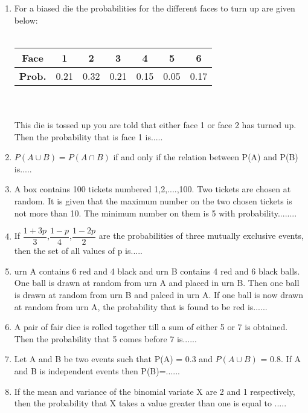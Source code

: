 \documentclass[journal,12pt,twocolumn]{IEEEtran}
\begin{document}
\renewcommand{\thefigure}{\theenumi}
\renewcommand{\thetable}{\theenumi}
\begin{enumerate}[label=\arabic*]
	\item For a biased die the probabilities for the different faces to turn up are given below:\\
	\\
	\begin{tabular}{ |c|c|c|c|c|c|c| }
	\hline
	\textbf{Face} &1 &2 &3 &4 &5 &6 \\
	\hline
	\textbf{Prob.} &0.21 &0.32 &0.21 &0.15 &0.05 &0.17 \\
	\hline
	\end{tabular}\\
	\\
	
	This die is tossed up you are told that either face 1 or face 2 has turned up. Then the probability that is face 1 is.....\\ 
	\item $P(A \cup B) =P(A \cap B)$ if and only if the relation between P(A) and P(B) is.....\\
	\item A box contains 100 tickets numbered 1,2,....,100. Two tickets are chosen at random. It is given that the maximum number on the two chosen tickets is not more than 10. The minimum number on them is 5 with probability........\\
	\item If $\dfrac{1+3p}{3}$,$\dfrac{1-p}{4}$,$\dfrac{1-2p}{2}$ are the probabilities of three mutually exclusive events, then the set of all values of p is.....\\
   \item urn A contains 6 red and 4 black and urn B contains 4 red and 6 black balls. One ball is drawn at random from urn A and placed in urn B. Then one ball is drawn at random from urn B and palced in urn A. If one ball is now drawn at random from urn A, the probability that is found to be red is......\\
   \item A pair of fair dice is rolled together till a sum of either 5 or 7 is obtained. Then the probability that 5 comes before 7 is......\\
	\item  Let A and B be two events such that P(A) = 0.3 and $P(A \cup B )$ = 0.8. If A and B is independent events then P(B)=......\\
	 \item If the mean and variance of the binomial variate X are 2 and 1 respectively, then the probability that X takes a value greater than one is equal to .....\\

\end{enumerate}
\end{document}
